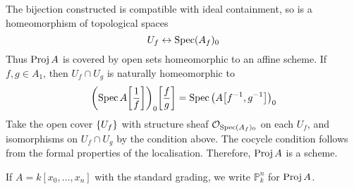 The bijection constructed is compatible with ideal containment, so is a homeomorphism of topological spaces
\[ U_f \leftrightarrow \operatorname{Spec} (A_f)_0 \]
Thus \( \operatorname{Proj} A \) is covered by open sets homeomorphic to an affine scheme.
If \( f, g \in A_1 \), then \( U_f \cap U_g \) is naturally homeomorphic to
\[ \qty(\operatorname{Spec} A\qty[\frac{1}{f}])_0\qty[\frac{f}{g}] = \operatorname{Spec} \qty(A\qty[f^{-1}, g^{-1}])_0 \]
Take the open cover \( \qty{U_f} \) with structure sheaf \( \mathcal O_{\operatorname{Spec} (A_f)_0} \) on each \( U_f \), and isomorphisms on \( U_f \cap U_g \) by the condition above.
The cocycle condition follows from the formal properties of the localisation.
Therefore, \( \operatorname{Proj} A \) is a scheme.

If \( A = k[x_0, \dots, x_n] \) with the standard grading, we write \( \mathbb P^n_k \) for \( \operatorname{Proj} A \).

